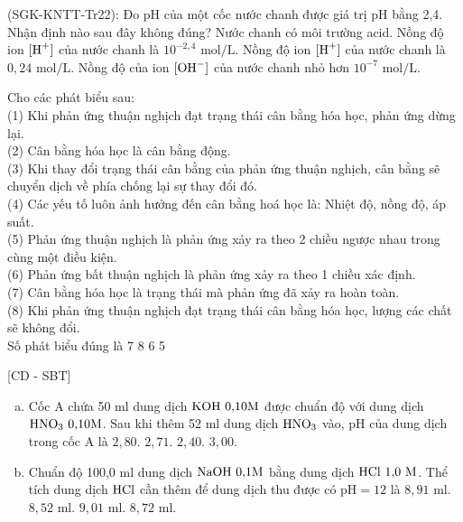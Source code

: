 \documentclass[12pt,a4paper]{article}
\begin{document}
\begin{ex}
(SGK-KNTT-Tr22): Đo pH của một cốc nước chanh được giá trị pH bằng 2,4. Nhận định nào sau đây không đúng?
\choice
{Nước chanh có môi trường acid.}
{Nồng độ ion $[\ce{H+}]$ của nước chanh là $10^{-2{,}4}\text{ mol/L}$.}
{Nồng độ ion $[\ce{H+}]$ của nước chanh là $0{,}24\text{ mol/L}$.}
{Nồng độ của ion $[\ce{OH-}]$ của nước chanh nhỏ hơn $10^{-7}\text{ mol/L}$.}
\loigiai{}
\end{ex}

\begin{ex}
Cho các phát biểu sau:\\
(1) Khi phản ứng thuận nghịch đạt trạng thái cân bằng hóa học, phản ứng dừng lại.\\
(2) Cân bằng hóa học là cân bằng động.\\
(3) Khi thay đổi trạng thái cân bằng của phản ứng thuận nghịch, cân bằng sẽ chuyển dịch về phía chống lại sự thay đổi đó.\\
(4) Các yếu tố luôn ảnh hưởng đến cân bằng hoá học là: Nhiệt độ, nồng độ, áp suất.\\
(5) Phản ứng thuận nghịch là phản ứng xảy ra theo 2 chiều ngược nhau trong cùng một điều kiện.\\
(6) Phản ứng bất thuận nghịch là phản ứng xảy ra theo 1 chiều xác định.\\
(7) Cân bằng hóa học là trạng thái mà phản ứng đã xảy ra hoàn toàn.\\
(8) Khi phản ứng thuận nghịch đạt trạng thái cân bằng hóa học, lượng các chất sẽ không đổi.\\
Số phát biểu đúng là
\choice
{7}
{8}
{6}
{5}
\loigiai{}
\end{ex}

\begin{ex}
{[CD - SBT]}
\begin{enumerate}[a)]
	\item Cốc A chứa 50 ml dung dịch $\ce{KOH}\ 0{,}10\text{M}$ được chuẩn độ với dung dịch $\ce{HNO3}\ 0{,}10\text{M}$. Sau khi thêm 52 ml dung dịch $\ce{HNO3}$ vào, pH của dung dịch trong cốc A là
	\choice
	{$2{,}80$.}
	{$2{,}71$.}
	{$2{,}40$.}
	{$3{,}00$.}
	\item Chuẩn độ 100,0 ml dung dịch $\ce{NaOH}\ 0{,}1\text{M}$ bằng dung dịch $\ce{HCl}\ 1{,}0\text{ M}$. Thể tích dung dịch $\ce{HCl}$ cần thêm để dung dịch thu được có $\text{pH} = 12$ là
	\choice
	{$8{,}91\text{ ml}$.}
	{$8{,}52\text{ ml}$.}
	{$9{,}01\text{ ml}$.}
	{$8{,}72\text{ ml}$.}
\end{enumerate}
\loigiai{}
\end{ex}
\end{document}
